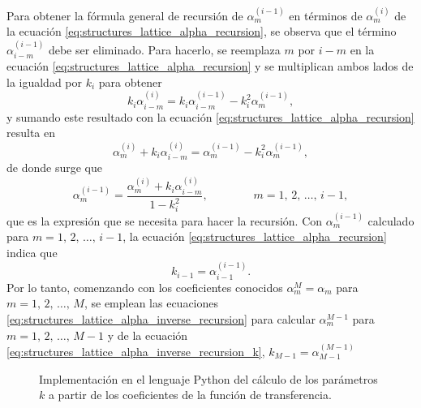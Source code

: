 \documentclass[a4paper]{report}
\begin{document}
Para obtener la fórmula general de recursión de \(\alpha^{(i-1)}_m\) en términos de \(\alpha^{(i)}_m\) de la ecuación \ref{eq:structures_lattice_alpha_recursion}, se observa que el término \(\alpha^{(i-1)}_{i-m}\) debe ser eliminado. Para hacerlo, se reemplaza \(m\) por \(i-m\) en la ecuación \ref{eq:structures_lattice_alpha_recursion} y se multiplican ambos lados de la igualdad por \(k_i\) para obtener
\[
 k_i\alpha^{(i)}_{i-m}=k_i\alpha^{(i-1)}_{i-m}-k_i^2\alpha^{(i-1)}_m,
\]
y sumando este resultado con la ecuación \ref{eq:structures_lattice_alpha_recursion} resulta en
\[
 \alpha^{(i)}_m+k_i\alpha^{(i)}_{i-m}=\alpha^{(i-1)}_m-k^2_i\alpha^{(i-1)}_m,
\]
de donde surge que 
\begin{equation}\label{eq:structures_lattice_alpha_inverse_recursion}
 \alpha^{(i-1)}_m=\frac{\alpha^{(i)}_m+k_i\alpha^{(i)}_{i-m}}{1-k_i^2},
  \qquad\qquad 
 m=1,\,2,\,\dots,\,i-1, 
\end{equation}
que es la expresión que se necesita para hacer la recursión. Con \(\alpha^{(i-1)}_m\) calculado para \(m=1,\,2,\,\dots,\,i-1\), la ecuación \ref{eq:structures_lattice_alpha_recursion} indica que
\begin{equation}\label{eq:structures_lattice_alpha_inverse_recursion_k}
 k_{i-1}=\alpha^{(i-1)}_{i-1}. 
\end{equation}
Por lo tanto, comenzando con los coeficientes conocidos \(\alpha^{M}_m=\alpha_m\) para \(m=1,\,2,\,\dots,\,M\), se emplean las ecuaciones \ref{eq:structures_lattice_alpha_inverse_recursion} para calcular \(\alpha^{M-1}_m\) para \(m=1,\,2,\,\dots,\,M-1\) y de la ecuación \ref{eq:structures_lattice_alpha_inverse_recursion_k}, \(k_{M-1}=\alpha^{(M-1)}_{M-1}\) 
\begin{figure}
\begin{center}

\caption{\label{fig:structures_lattice_alpha_to_k} Implementación en el lenguaje Python del cálculo de los parámetros \(k\) a partir de los coeficientes de la función de transferencia.}
\end{center}
\end{figure}
\end{document}
